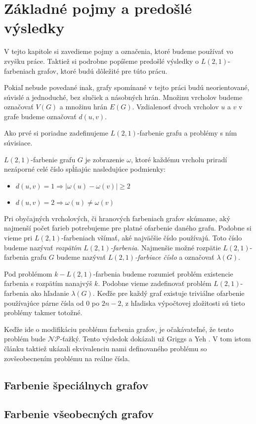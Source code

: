 \chapter{Základné pojmy a predošlé výsledky}

V tejto kapitole si zavedieme pojmy a označenia, ktoré budeme používať
vo zvyšku práce. Taktiež si podrobne popíšeme predošlé výsledky o
$L(2,1)$-farbeniach grafov, ktoré budú dôležité pre túto prácu.

Pokiaľ nebude povedané inak, grafy spomínané v tejto práci budú neorientované,
súvislé a jednoduché, bez slučiek a násobných hrán. Množinu vrcholov budeme
označovať $V(G)$ a množinu hrán $E(G)$. Vzdialenosť dvoch vrcholov $u$ a $v$
v grafe budeme označovať $d(u,v)$. 

Ako prvé si poriadne
zadefinujeme $L(2,1)$-farbenie grafu a problémy s ním súvisiace.

\begin{defn}
$L(2,1)$-farbenie grafu $G$ je zobrazenie $\omega$, ktoré každému vrcholu priradí
nezáporné celé číslo spĺňajúc nasledujúce podmienky:

\begin{itemize}
\item $d(u, v) = 1 \Rightarrow \left| \omega(u) - \omega(v) \right| \ge 2$
\item $d(u, v) = 2 \Rightarrow \omega(u) \neq \omega(v)$
\end{itemize}
\end{defn}

Pri obyčajných vrcholových, či hranových farbeniach grafov skúmame, aký
najmenší počet farieb potrebujeme pre platné ofarbenie daného grafu. Podobne
si vieme pri $L(2,1)$-farbeniach všímať, aké najväčšie číslo používajú. Toto
číslo budeme nazývať \emph{rozpätím $L(2,1)$-farbenia}. Najmenšie možné rozpätie
$L(2,1)$-farbenia grafu $G$ budeme nazývať \emph{$L(2,1)$-farbiace číslo} a
označovať $\lambda(G)$.

Pod problémom $k-L(2,1)$-farbenia budeme rozumieť problém existencie farbenia
s rozpätím nanajvýš $k$. Podobne vieme zadefinovať problém $L(2,1)$-farbenia ako
hľadanie $\lambda(G)$. Keďže pre každý graf existuje triviálne ofarbenie
používajúce párne čísla od $0$ po $2n - 2$, z hľadiska výpočtovej zložitosti
sú tieto problémy takmer totožné.

Keďže ide o modifikáciu problému farbenia grafov, je očakávateľné, že tento
problém bude $\mathcal{NP}$-ťažký. Tento výsledok dokázali už Griggs a Yeh
\cite{griggs_yeh_tree}. V tom istom článku taktiež ukázali ekvivalenciu
nami definovaného problému so zovšeobecnením problému na reálne čísla.


\section{Farbenie špeciálnych grafov}



\section{Farbenie všeobecných grafov}
